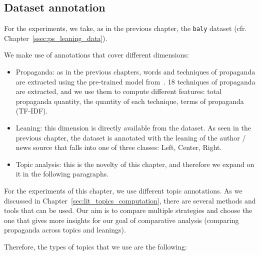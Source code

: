 \subsection{\statusgreen Dataset annotation}
\label{sec:topic_method_data}

For the experiments, we take, as in the previous chapter, the \texttt{baly} dataset (cfr. Chapter~\ref{ssec:ps_leaning_data}).

We make use of annotations that cover different dimensions:
\begin{itemize}
    \item Propaganda: as in the previous chapters, words and techniques of propaganda are extracted using the pre-trained model from~\cite{da2019fine}. 18 techniques of propaganda are extracted, and we use them to compute different features: total propaganda quantity, the quantity of each technique, terms of propaganda (TF-IDF).
    \item Leaning: this dimension is directly available from the dataset. As seen in the previous chapter, the dataset is annotated with the leaning of the author / news source that falls into one of three classes: Left, Center, Right.
    \item Topic analysis: this is the novelty of this chapter, and therefore we expand on it in the following paragraphs. %
\end{itemize}



For the experiments of this chapter, we use different topic annotations. As we discussed in Chapter~\ref{sec:lit_topics_computation}, there are several methods and tools that can be used.
Our aim is to compare multiple strategies and choose the one that gives more insights for our goal of comparative analysis (comparing propaganda across topics and leanings).

Therefore, the types of topics that we use are the following:

